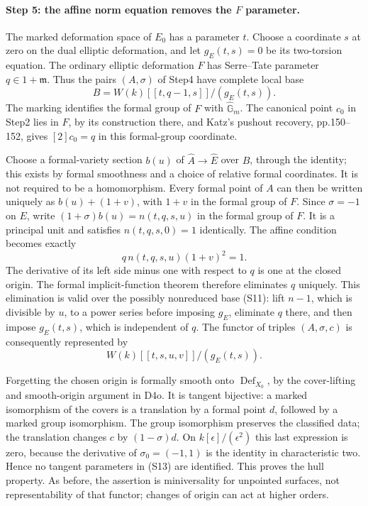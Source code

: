 \paragraph{Step 5: the affine norm equation removes the $F$ parameter.}
The marked deformation space of $E_0$ has a parameter $t$.
Choose a coordinate $s$ at zero on the dual elliptic deformation,
and let $g_E(t,s)=0$ be its two-torsion equation. The ordinary
elliptic deformation $F$ has Serre--Tate parameter $q\in1+\mathfrak m$.
Thus the pairs $(A,\sigma)$ of Step4 have complete local base
\[
 B=W(k)[[t,q-1,s]]/(g_E(t,s)).                           \tag{S11}
\]
The marking identifies the formal group of $F$ with
$\widehat{\mathbb G}_m$. The canonical point $c_0$ in Step2 lies
in $F$, by its construction there, and Katz's pushout recovery,
pp.150--152, gives $[2]c_0=q$ in this formal-group coordinate.

Choose a formal-variety section $b(u)$ of
$\widehat A\to\widehat E$ over $B$, through the identity; this
exists by formal smoothness and a choice of relative formal
coordinates. It is not required to be a homomorphism. Every formal
point of $A$ can then be written uniquely as $b(u)+(1+v)$, with
$1+v$ in the formal group of $F$. Since $\sigma=-1$ on $E$,
write $(1+\sigma)b(u)=n(t,q,s,u)$ in the formal group of $F$.
It is a principal unit and satisfies $n(t,q,s,0)=1$ identically.
The affine condition becomes exactly
\[
                 q\,n(t,q,s,u)(1+v)^2=1.               \tag{S12}
\]
The derivative of its left side minus one with respect to $q$ is
one at the closed origin. The formal implicit-function theorem
therefore eliminates $q$ uniquely. This elimination is valid over
the possibly nonreduced base (S11): lift $n-1$, which is divisible
by $u$, to a power series before imposing $g_E$, eliminate $q$
there, and then impose $g_E(t,s)$, which is independent of $q$.
The functor of triples $(A,\sigma,c)$ is consequently represented
by
\[
                    W(k)[[t,s,u,v]]/(g_E(t,s)).          \tag{S13}
\]

Forgetting the chosen origin is formally smooth onto
$\operatorname{Def}_{X_0}$, by the cover-lifting and smooth-origin
argument in D4o. It is tangent bijective: a marked isomorphism of
the covers is a translation by a formal point $d$, followed by a
marked group isomorphism. The group isomorphism preserves the
classified data; the translation changes $c$ by $(1-\sigma)d$.
On $k[\epsilon]/(\epsilon^2)$ this last expression is zero,
because the derivative of $\sigma_0=(-1,1)$ is the identity in
characteristic two. Hence no tangent parameters in (S13) are
identified. This proves the hull property. As before, the assertion
is miniversality for unpointed surfaces, not representability of that
functor; changes of origin can act at higher orders.

